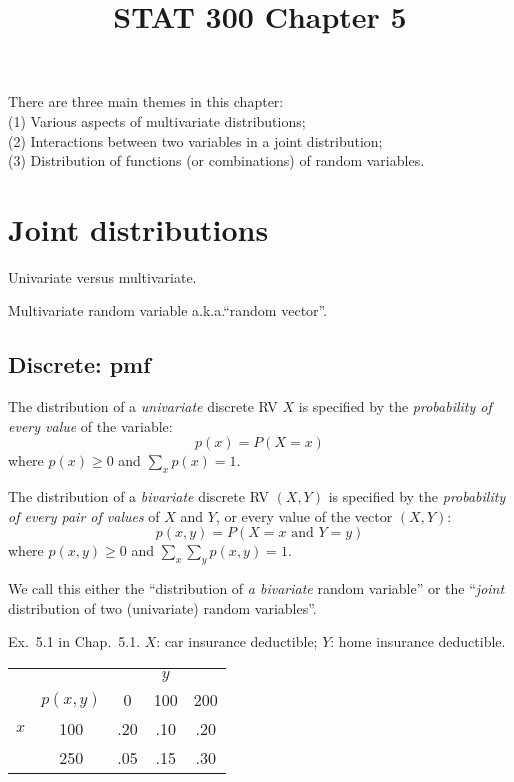 \documentclass[12pt]{article}
\begin{document}
\title{STAT 300 Chapter 5}
\maketitle

There are three main themes in this chapter:\\
(1) Various aspects of multivariate distributions;\\
(2) Interactions between two variables in a joint distribution;\\
(3) Distribution of functions (or combinations) of random variables.


\section{Joint distributions}

Univariate versus multivariate.

Multivariate random variable a.k.a.\@ ``random vector''.

\subsection{Discrete: pmf}

The distribution of a \emph{univariate} discrete RV $X$ is specified
by the \emph{probability of every value} of the variable:
\[
p(x) = P(X = x)
\]
where $p(x) \ge 0$ and $\sum_x p(x) = 1$.

The distribution of a \emph{bivariate} discrete RV $(X, Y)$
is specified by the \emph{probability of every pair of values}
of $X$ and $Y$, or every value of the vector $(X,Y)$:
\[
p(x,y) = P(X = x \text{ and } Y = y)
\]
where $p(x,y) \ge 0$ and $\sum_x \sum_y p(x,y) = 1$.

We call this either
the ``distribution of \emph{a bivariate} random variable'' or
the ``\emph{joint} distribution of two (univariate) random variables''.

\example
Ex.~5.1 in Chap.~5.1.
$X$: car insurance deductible;
$Y$: home insurance deductible.

\begin{center}
\begin{tabular}{cc|ccc}
     &          &       & $y$   &  \\[1pt]
     & $p(x,y)$ &  0    & 100   & 200\\[1pt] \hline
$x$  & 100      & .20   & .10   & .20\\
     & 250      & .05   & .15   & .30
\end{tabular}
\end{center}
\end{document}
